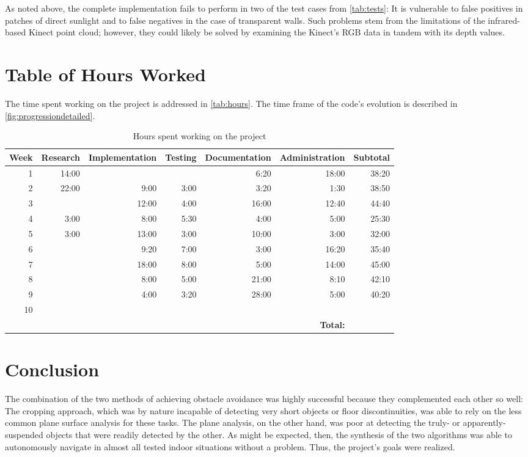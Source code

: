 \documentclass[12pt]{report}
\begin{document}
As noted above, the complete implementation fails to perform in two of the test cases from \autoref{tab:tests}:  It is vulnerable to false positives in patches of direct sunlight and to false negatives in the case of transparent walls.  Such problems stem from the limitations of the infrared-based Kinect point cloud; however, they could likely be solved by examining the Kinect's RGB data in tandem with its depth values.

\section{Table of Hours Worked}
The time spent working on the project is addressed in \autoref{tab:hours}.  The time frame of the code's evolution is described in \autoref{fig:progressiondetailed}.
\begin{table}[h]
\caption[Hours worked]{Hours spent working on the project}
\label{tab:hours}
\begin{tabular}{| r | r | r | r | r | r | r |}
\hline
\scriptsize\textbf{Week} & \scriptsize\textbf{Research} & \scriptsize\textbf{Implementation} & \scriptsize\textbf{Testing} & \scriptsize\textbf{Documentation} & \scriptsize\textbf{Administration} & \scriptsize\textbf{Subtotal} \\
\hline\hline
1 & 14:00 &  &  & 6:20 & 18:00 & 38:20 \\
\hline
2 & 22:00 & 9:00 & 3:00 & 3:20 & 1:30 & 38:50 \\
\hline
3 &  & 12:00 & 4:00 & 16:00 & 12:40 & 44:40 \\
\hline
4 & 3:00 & 8:00 & 5:30 & 4:00 & 5:00 & 25:30 \\
\hline
5 & 3:00 & 13:00 & 3:00 & 10:00 & 3:00 & 32:00 \\
\hline
6 &  & 9:20 & 7:00 & 3:00 & 16:20 & 35:40 \\
\hline
7 &  & 18:00 & 8:00 & 5:00 & 14:00 & 45:00 \\
\hline
8 &  & 8:00 & 5:00 & 21:00 & 8:10 & 42:10 \\
\hline
9 &  & 4:00 & 3:20 & 28:00 & 5:00 & 40:20 \\
\hline
10 &  &  &  &  &  & \\
\hline\hline
&&&&& \scriptsize\textbf{Total:} & \\
\hline
\end{tabular}
\end{table}

\section{Conclusion}
The combination of the two methods of achieving obstacle avoidance was highly successful because they complemented each other so well:  The cropping approach, which was by nature incapable of detecting very short objects or floor discontinuities, was able to rely on the less common plane surface analysis for these tasks.  The plane analysis, on the other hand, was poor at detecting the truly- or apparently-suspended objects that were readily detected by the other.  As might be expected, then, the synthesis of the two algorithms was able to autonomously navigate in almost all tested indoor situations without a problem.  Thus, the project's goals were realized.
\end{document}
